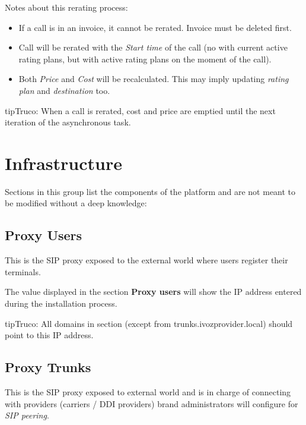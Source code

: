 \documentclass[letterpaper,10pt,spanish]{sphinxmanual}
\begin{document}
Notes about this rerating process:
\begin{itemize}
\item {} 
If a call is in an invoice, it cannot be rerated. Invoice must be deleted first.

\item {} 
Call will be rerated with the \emph{Start time} of the call (no with current active rating plans, but with active rating plans
on the moment of the call).

\item {} 
Both \emph{Price} and \emph{Cost} will be recalculated. This may imply updating \emph{rating plan} and \emph{destination} too.

\end{itemize}

\begin{notice}{tip}{Truco:}
When a call is rerated, cost and price are emptied until the next iteration of the asynchronous task.
\end{notice}


\section{Infrastructure}
\label{administration_portal/platform/infrastructure/index:infrastructure}\label{administration_portal/platform/infrastructure/index::doc}
Sections in this group list the components of the platform and are not meant to be modified without a deep knowledge:


\subsection{Proxy Users}
\label{administration_portal/platform/infrastructure/proxy_users:proxy-users}\label{administration_portal/platform/infrastructure/proxy_users:proxyusers}\label{administration_portal/platform/infrastructure/proxy_users::doc}
This is the SIP proxy exposed to the external world where users register their
terminals.

The value displayed in the section \textbf{Proxy users} will show the IP address
entered during the installation process.

\begin{notice}{tip}{Truco:}
All domains in  section (except from trunks.ivozprovider.local) should point to this IP address.
\end{notice}


\subsection{Proxy Trunks}
\label{administration_portal/platform/infrastructure/proxy_trunks:proxy-trunks}\label{administration_portal/platform/infrastructure/proxy_trunks::doc}\label{administration_portal/platform/infrastructure/proxy_trunks:id1}
This is the SIP proxy exposed to external world and is in charge of connecting
with providers (carriers / DDI providers) brand administrators will configure for \emph{SIP peering}.
\end{document}
